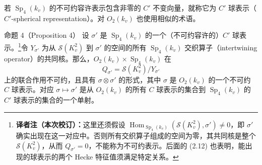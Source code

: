 若 $\operatorname{Sp}_4(k_v)$ 的不可约容许表示包含非零的 $C'$ 不变向量，就称它为 $C'$ 球表示（$C'$-spherical representation）。对 $O_2(k_v)$ 也使用相似的术语。

\begin{originaltheorem}{命题 4（Proposition 4）}
设 $\sigma'$ 是 $\operatorname{Sp}_4(k_v)$ 的一个（不可约容许的）$C'$ 球表示。\footnote{\textbf{译者注（本次校订）：}这里还须假设 $\operatorname{Hom}_{\operatorname{Sp}_4(k_v)}(\mathcal S(K_v^2),\sigma')\ne0$，即 $\sigma'$ 确实出现在这一对应中。否则所有交织算子组成的空间为零，其共同核是整个 $\mathcal S(K_v^2)$，从而 $Q_{\sigma'}=0$，不能称为不可约表示。后面的 (2.12) 也表明，能出现的球表示的两个 Hecke 特征值须满足特定关系。}令 $Y_{\sigma'}$ 为从 $\mathcal S(K_v^2)$ 到 $\sigma'$ 的空间的所有 $\operatorname{Sp}_4(k_v)$ 交织算子（intertwining operator）的共同核。那么，$O_2(k_v)\times\operatorname{Sp}_4(k_v)$ 在
\[
 Q_{\sigma'}=\mathcal S(K_v^2)/Y_{\sigma'}
\]
上的联合作用不可约，且具有 $\sigma\otimes\sigma'$ 的形式，其中 $\sigma$ 是 $O_2(k_v)$ 的一个不可约 $C$ 球表示。对应 $\sigma\mapsto\sigma'$ 是从 $O_2(k_v)$ 的所有 $C$ 球表示的集合到 $\operatorname{Sp}_4(k_v)$ 的 $C'$ 球表示的集合的一个单射。
\end{originaltheorem}
